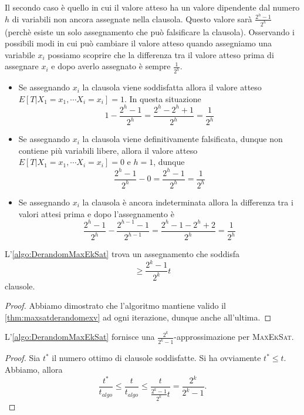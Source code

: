 Il secondo caso è quello in cui il valore atteso ha un valore dipendente dal
numero $h$ di variabili non ancora assegnate nella clausola. Questo valore
sarà $\frac{2^h - 1}{2^h}$ (perchè esiste un solo assegnamento che può
falsificare la clausola).
Osservando i possibili modi in cui può cambiare il valore atteso quando
assegniamo una variabile $x_i$ possiamo scoprire che la differenza tra
il valore atteso prima di assegnare $x_i$ e dopo averlo assegnato è sempre
$\frac{1}{2^h}$.
\begin{itemize}
	\item Se assegnando $x_i$ la clausola viene soddisfatta allora il valore
	atteso $E[T|X_1 = x_1, \cdots X_i=x_i] = 1$. In questa situazione
	$$
		1 - \frac{2^h - 1}{2^h} = \frac{2^h - 2^h + 1}{2^h} = \frac{1}{2^h}
	$$

	\item Se assegnando $x_i$ la clausola viene definitivamente falsificata,
	dunque non contiene più variabili libere, allora il valore atteso
	$E[T|X_1 = x_1, \cdots X_i=x_i] = 0$ e $h=1$, dunque
	$$
		\frac{2^h - 1}{2^h} - 0 = \frac{2^h - 1}{2^h} = \frac{1}{2^h}
	$$

	\item Se assegnando $x_i$ la clausola è ancora indeterminata allora
	la differenza tra i valori attesi prima e dopo l'assegnamento è
	$$
		\frac{2^h - 1}{2^h} - \frac{2^{h-1} - 1}{2^{h-1}} = \frac{2^h - 1 - 2^h + 2}{2^h} = \frac{1}{2^h}
	$$
\end{itemize}

\begin{theorem}
	L'\cref{algo:DerandomMaxEkSat} trova un assegnamento che soddisfa
	$$
		\geq \frac{2^k -1}{2^k} t
	$$
	clausole.
\end{theorem}
\begin{proof}
	Abbiamo dimostrato che l'algoritmo mantiene valido il
	\cref{thm:maxsatderandomexv} ad ogni iterazione, dunque anche all'ultima.
\end{proof}
\begin{corollario}
	L'\cref{algo:DerandomMaxEkSat} fornisce una $\frac{2^k}{2^k -1}$-approssimazione per
	\textsc{MaxEkSat}.
\end{corollario}
\begin{proof}
	Sia $t^*$ il numero ottimo di clausole soddisfatte. Si ha ovviamente $t^* \leq t$.
	Abbiamo, allora
	$$
		\frac{t^*}{t_{algo}} \leq \frac{t}{t_{algo}} \leq \frac{t}{\frac{2^k -1}{2^k} t}  = \frac{2^k}{2^k -1}.
	$$
\end{proof}

